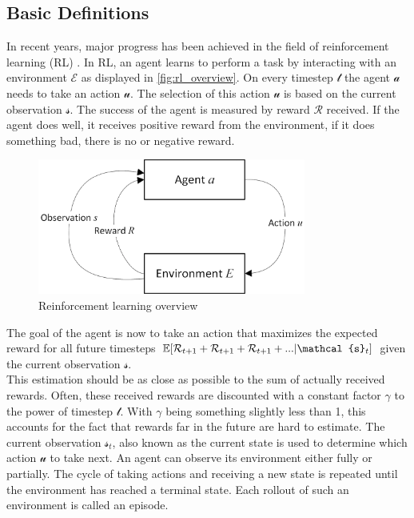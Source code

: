 \subsection*{Basic Definitions}\label{basic_rl_definitions}
In recent years, major progress has been achieved in the field of reinforcement learning (RL) \cite{mnih2013playing,alphazero,hideandseek}.
In RL, an agent learns to perform a task by interacting with an environment $\mathcal{E}$ as displayed in \autoref{fig:rl_overview}. On every timestep $\mathcal{t}$ the agent $\mathcal{a}$ needs to take an action $\mathcal{u}$. The selection of this action $\mathcal{u}$ is based on the current observation $\mathcal{s}$. The success of the agent is measured by reward $\mathcal{R}$ received. If the agent does well, it receives positive reward from the environment, if it does something bad, there is no or negative reward.
\begin{figure}[H]
	\centering
	\includegraphics[width=250pt]{images/rl_overview.png}
	\caption{Reinforcement learning overview}
	\label{fig:rl_overview}
\end{figure}
The goal of the agent is now to take an action that maximizes the expected reward for all future timesteps $\EX[\mathcal{R}_{t+1}+\mathcal{R}_{t+1}+\mathcal{R}_{t+1}+...|\mathcal{s}_{t}]$ given the current observation $\mathcal{s}$.\\
This estimation should be as close as possible to the sum of actually received rewards. Often, these received rewards are discounted with a constant factor $\mathcal{\gamma}$ to the power of timestep $\mathcal{t}$. With $\mathcal{\gamma}$ being something slightly less than 1, this accounts for the fact that rewards far in the future are hard to estimate.
The current observation $\mathcal{s}_{t}$, also known as the current state is used to determine which action $\mathcal{u}$ to take next. An agent can observe its environment either fully or partially. The cycle of taking actions and receiving a new state is repeated until the environment has reached a terminal state. Each rollout of such an environment is called an episode.
